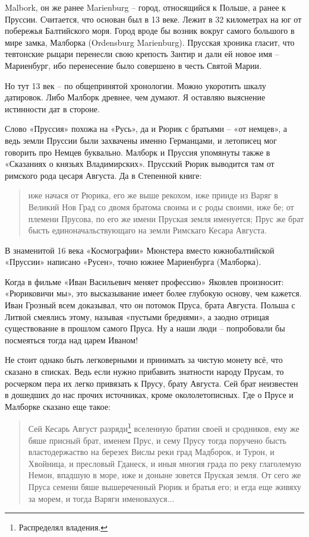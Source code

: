 Malbork, он же ранее Marienburg – город, относящийся к Польше, а ранее к Пруссии. Считается, что основан был в 13 веке. Лежит в 32 километрах на юг от побережья Балтийского моря. Город вроде бы возник вокруг самого большого в мире замка, Малборка (Ordensburg Marienburg). Прусская хроника гласит, что тевтонские рыцари перенесли свою крепость Зантир и дали ей новое имя – Мариенбург, ибо перенесение было совершено в честь Святой Марии.

Но тут 13 век – по общепринятой хронологии. Можно укоротить шкалу датировок. Либо Малборк древнее, чем думают. Я оставляю выяснение истинности дат в стороне.

Слово «Пруссия» похожа на «Русь», да и Рюрик с братьями – «от немцев», а ведь земли Пруссии были захвачены именно Германцами, и летописец мог говорить про Немцев буквально. Малборк и Пруссия упомянуты также в «Сказаниях о князьях Владимирских». Прусский Рюрик выводится там от римского рода цесаря Августа. Да в Степенной книге:

\begin{quotation}
иже начася от Рюрика, его же выше рекохом, иже прииде из Варяг в Великий Нов Град со двомя братома своима и с роды своими, иже бе; от племени Прусова, по его же имени Пруская земля именуется; Прус же брат бысть единоначальствующаго на земли Римскаго Кесара Августа.
\end{quotation}

В знаменитой 16 века «Космографии» Мюнстера вместо южнобалтийской «Пруссии» написано «Русен», точно южнее Мариенбурга (Малборка). 

Когда в фильме «Иван Васильевич меняет профессию» Яковлев произносит: «Рюриковичи мы», это высказывание имеет более глубокую основу, чем кажется. Иван Грозный всем доказывал, что он потомок Пруса, брата Августа. Польша с Литвой смеялись этому, называя «пустыми бреднями», а заодно отрицая существование в прошлом самого Пруса. Ну а наши люди – попробовали бы посмеяться тогда над царем Иваном!

Не стоит однако быть легковерными и принимать за чистую монету всё, что сказано в списках. Ведь если нужно прибавить знатности народу Прусам, то росчерком пера их легко привязать к Прусу, брату Августа. Сей брат неизвестен в дошедших до нас прочих источниках, кроме окололетописных. Где о Прусе и Малборке сказано еще такое\cite[стр. 116]{gilyarov01}:

\begin{quotation}
Сей Кесарь Август разряди\footnote{Распределял владения.} вселенную братии своей и сродников, ему же бяше присный брат, именем Прус, и сему Прусу тогда поручено бысть властодержаство на березех Вислы реки град Мадборок, и Турон, и Хвойница, и пресловый Гданеск, и иныя многия града по реку глаголемую Немон, впадшую в море, иже и доныне зовется Пруская земля. От сего же Пруса семени бяше вышереченный Рюрик и братья его; и егда еще живяху за морем, и тогда Варяги именовахуся...
\end{quotation}

